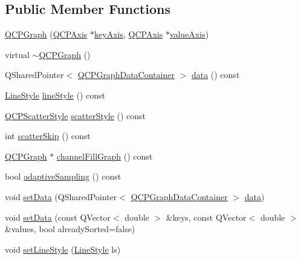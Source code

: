 \subsection*{Public Member Functions}
\begin{DoxyCompactItemize}
\item 
\hyperlink{class_q_c_p_graph_a0393a38cf7183cbf46348eb6cf9a5a6c}{Q\+C\+P\+Graph} (\hyperlink{class_q_c_p_axis}{Q\+C\+P\+Axis} $\ast$\hyperlink{class_q_c_p_abstract_plottable_a2cdd6f0dd5e9a979037f86b4000d9cfe}{key\+Axis}, \hyperlink{class_q_c_p_axis}{Q\+C\+P\+Axis} $\ast$\hyperlink{class_q_c_p_abstract_plottable_af47809a644a68ffd955fb30b01fb4f2f}{value\+Axis})
\item 
virtual \hyperlink{class_q_c_p_graph_ae9998cfb9d379ac0ef3fbd6995cfbd76}{$\sim$\+Q\+C\+P\+Graph} ()
\item 
Q\+Shared\+Pointer$<$ \hyperlink{qcustomplot_8h_a2e5583d1ae212f0deb10537cf975a15a}{Q\+C\+P\+Graph\+Data\+Container} $>$ \hyperlink{class_q_c_p_graph_a141aa31a1f19bbd0ce60f55eaeb9ea60}{data} () const
\item 
\hyperlink{class_q_c_p_graph_ad60175cd9b5cac937c5ee685c32c0859}{Line\+Style} \hyperlink{class_q_c_p_graph_ac3e6f4b3387338df45992b47691b2551}{line\+Style} () const
\item 
\hyperlink{class_q_c_p_scatter_style}{Q\+C\+P\+Scatter\+Style} \hyperlink{class_q_c_p_graph_a36d5b641db08e27527827c212542bbbd}{scatter\+Style} () const
\item 
int \hyperlink{class_q_c_p_graph_a44487a3a706605bb9fc97ad5e05d347e}{scatter\+Skip} () const
\item 
\hyperlink{class_q_c_p_graph}{Q\+C\+P\+Graph} $\ast$ \hyperlink{class_q_c_p_graph_a84277b1655474453a5c83318053414d5}{channel\+Fill\+Graph} () const
\item 
bool \hyperlink{class_q_c_p_graph_a1ba934b9621270b9a40fcdd2d9ba2adb}{adaptive\+Sampling} () const
\item 
void \hyperlink{class_q_c_p_graph_a1eae9429a316b008e2d99b2d65a54395}{set\+Data} (Q\+Shared\+Pointer$<$ \hyperlink{qcustomplot_8h_a2e5583d1ae212f0deb10537cf975a15a}{Q\+C\+P\+Graph\+Data\+Container} $>$ \hyperlink{class_q_c_p_graph_a141aa31a1f19bbd0ce60f55eaeb9ea60}{data})
\item 
void \hyperlink{class_q_c_p_graph_a73578d786532132310a926c3cd529b29}{set\+Data} (const Q\+Vector$<$ double $>$ \&keys, const Q\+Vector$<$ double $>$ \&values, bool already\+Sorted=false)
\item 
void \hyperlink{class_q_c_p_graph_a513fecccff5b2a50ce53f665338c60ff}{set\+Line\+Style} (\hyperlink{class_q_c_p_graph_ad60175cd9b5cac937c5ee685c32c0859}{Line\+Style} ls)

\end{DoxyCompactItemize}
